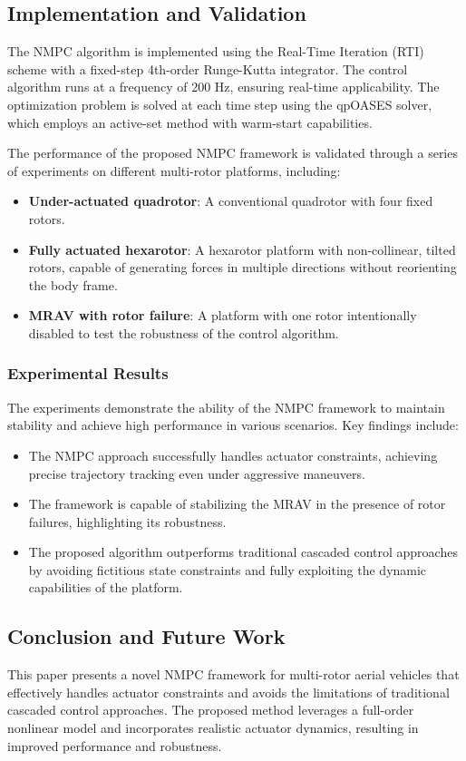 \documentclass[a4paper,12pt]{article}
\begin{document}
\subsection{Implementation and Validation}
The NMPC algorithm is implemented using the Real-Time Iteration (RTI) scheme with a fixed-step 4th-order Runge-Kutta integrator. The control algorithm runs at a frequency of 200 Hz, ensuring real-time applicability. The optimization problem is solved at each time step using the qpOASES solver, which employs an active-set method with warm-start capabilities.

The performance of the proposed NMPC framework is validated through a series of experiments on different multi-rotor platforms, including:
\begin{itemize}
	\item \textbf{Under-actuated quadrotor}: A conventional quadrotor with four fixed rotors.
	\item \textbf{Fully actuated hexarotor}: A hexarotor platform with non-collinear, tilted rotors, capable of generating forces in multiple directions without reorienting the body frame.
	\item \textbf{MRAV with rotor failure}: A platform with one rotor intentionally disabled to test the robustness of the control algorithm.
\end{itemize}

\subsubsection{Experimental Results}
The experiments demonstrate the ability of the NMPC framework to maintain stability and achieve high performance in various scenarios. Key findings include:
\begin{itemize}
	\item The NMPC approach successfully handles actuator constraints, achieving precise trajectory tracking even under aggressive maneuvers.
	\item The framework is capable of stabilizing the MRAV in the presence of rotor failures, highlighting its robustness.
	\item The proposed algorithm outperforms traditional cascaded control approaches by avoiding fictitious state constraints and fully exploiting the dynamic capabilities of the platform.
\end{itemize}

\subsection{Conclusion and Future Work}
This paper presents a novel NMPC framework for multi-rotor aerial vehicles that effectively handles actuator constraints and avoids the limitations of traditional cascaded control approaches. The proposed method leverages a full-order nonlinear model and incorporates realistic actuator dynamics, resulting in improved performance and robustness.
\end{document}
